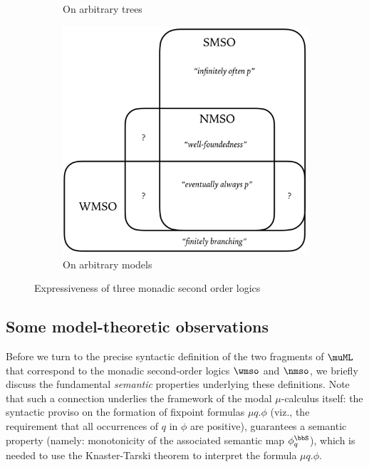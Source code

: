 \begin{figure}[htb]
\begin{subfigure}[b]{0.3\textwidth}
    \caption{On arbitrary trees}
    \label{fig:tree}
\end{subfigure}
\begin{subfigure}[b]{0.3\textwidth}
    \includegraphics[width=\textwidth]{figures/slog.png}
    \caption{On arbitrary models}
    \label{fig:mouse}
\end{subfigure}
\caption{Expressiveness of three monadic second order logics}
\label{fig:lands}
\end{figure}

\subsection{Some model-theoretic observations}

Before we turn to the precise syntactic definition of the two fragments of 
$\muML$ that correspond to the monadic second-order logics $\wmso$ and $\nmso$,
we briefly discuss the fundamental \emph{semantic} properties underlying these
definitions.
Note that such a connection underlies the framework of the modal $\mu$-calculus
itself: the syntactic proviso on the formation of fixpoint formulas $\mu q.\phi$ 
(viz., the requirement that all occurrences of $q$ in $\phi$ are positive), 
guarantees a semantic property (namely: monotonicity of the associated semantic 
map $\phi^{\bbS}_{q}$), which is needed to use the Knaster-Tarski theorem 
to interpret the formula $\mu q.\phi$.

